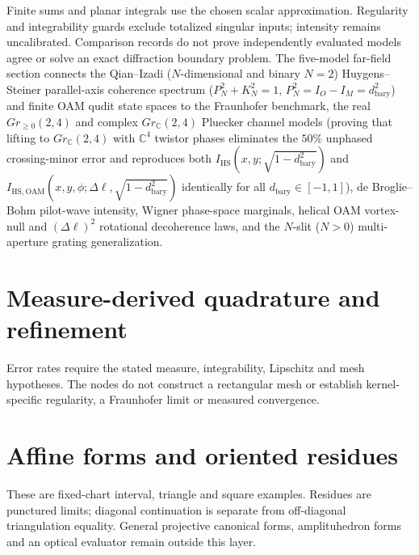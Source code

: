 Finite sums and planar integrals use the chosen scalar approximation.
Regularity and integrability guards exclude totalized singular inputs;
intensity remains uncalibrated. Comparison records do not prove independently
evaluated models agree or solve an exact diffraction boundary problem.
The five-model far-field section connects the Qian--Izadi ($N$-dimensional and
binary $N=2$) Huygens--Steiner parallel-axis coherence spectrum
($P_N^2+K_N^2=1$, $P_N^2=I_O-I_M=d_{\mathrm{bary}}^2$) and finite OAM qudit
state spaces to the Fraunhofer benchmark, the real $Gr_{\ge 0}(2,4)$ and
complex $Gr_{\mathbb C}(2,4)$ Pluecker channel models (proving that lifting to
$Gr_{\mathbb C}(2,4)$ with $\mathbb C^4$ twistor phases eliminates the $50\%$
unphased crossing-minor error and reproduces both $I_{\mathrm{HS}}(x,y;\sqrt{1-d_{\mathrm{bary}}^2})$
and $I_{\mathrm{HS,OAM}}(x,y,\phi;\Delta\ell,\sqrt{1-d_{\mathrm{bary}}^2})$
identically for all $d_{\mathrm{bary}}\in[-1,1]$), de Broglie--Bohm pilot-wave
intensity, Wigner phase-space marginals, helical OAM vortex-null and
$(\Delta\ell)^2$ rotational decoherence laws, and the $N$-slit ($N>0$)
multi-aperture grating generalization.


\section{Measure-derived quadrature and refinement}

Error rates require the stated measure, integrability, Lipschitz and mesh
hypotheses. The nodes do not construct a rectangular mesh or establish
kernel-specific regularity, a Fraunhofer limit or measured convergence.


\section{Affine forms and oriented residues}

These are fixed-chart interval, triangle and square examples. Residues are
punctured limits; diagonal continuation is separate from off-diagonal
triangulation equality. General projective canonical forms, amplituhedron
forms and an optical evaluator remain outside this layer.


